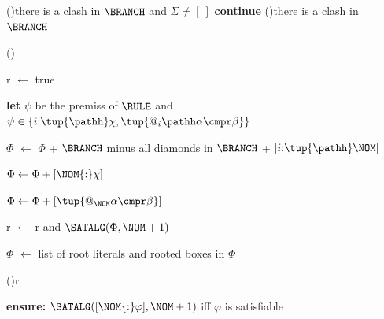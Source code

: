 \begin{algorithm}[t]
\begin{small}
{{                \vspace*{2pt}

                \If(){there is a clash in $\BRANCH$ and $\Sigma \neq [~]$}
                    {{\bf continue}\;}
                \ElseIf(){there is a clash in $\BRANCH$}
                    {\;}

                \vspace*{2pt}

                \RecStep()
                {
                    r $\gets$ true\;
                    {
                        {\bf let} $\psi$ be the premiss of $\RULE$ and $\psi \in \{i{:}\tup{\pathh}\chi, \tup{@_i\pathh\alpha \cmpr \beta}\}$\;

                        $\Phi$ $\gets$ $\Phi$ + $\BRANCH$ minus all diamonds in $\BRANCH$ + $[i{:}\tup{\pathh}\NOM]$\;

                            {$\Phi \gets \Phi + [\NOM{:}\chi]$}

                            {$\Phi \gets \Phi + [\tup{@_{\NOM}\alpha \cmpr \beta}]$}

                        {r $\gets$ r and $\SATALG(\Phi, \NOM+1)$}\;

                        $\Phi$ $\gets$ list of root literals and rooted boxes in $\Phi$\;
                    }
                }

                \vspace*{2pt}

                \lIf(){r}{}
            }
            \;
            {\bf ensure:} $\SATALG([\NOM{:}\varphi],\NOM+1)$ iff $\varphi$ is satisfiable
        }
    \end{small}
\end{algorithm}
